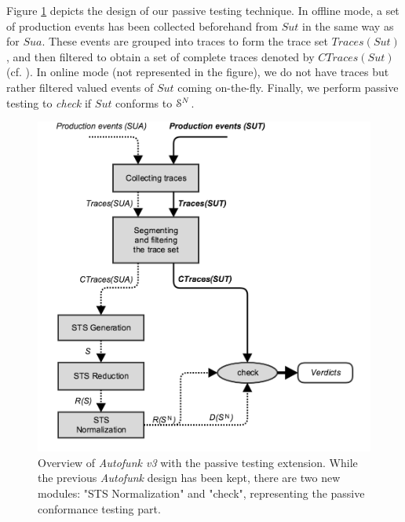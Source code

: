 Figure \ref{fig:passive-autofunk} depicts the design of our
passive testing technique. In offline mode, a set of production
events has been collected beforehand from $\mathit{Sut}$ in the
same way as for $\mathit{Sua}$. These events are grouped into
traces to form the trace set $Traces({Sut})$, and then filtered
to obtain a set of complete traces denoted by $CTraces({Sut})$
(cf.
).
In online mode (not represented in the figure), we do not have
traces but rather filtered valued events of $\mathit{Sut}$ coming
on-the-fly. Finally, we perform passive testing to \emph{check}
if $\mathit{Sut}$ conforms to $\EuScript{S}^{N}$.

\begin{figure}[h]
    \begin{center}
        \includegraphics[width=1.0\linewidth]{figures/passive_autofunk.png}
    \end{center}

    \caption{Overview of \textit{Autofunk v3} with the
    passive testing extension. While the previous
    \textit{Autofunk} design has been kept, there are
    two new modules: "STS Normalization" and "check",
    representing the passive conformance testing part.}
    \label{fig:passive-autofunk}
\end{figure}

